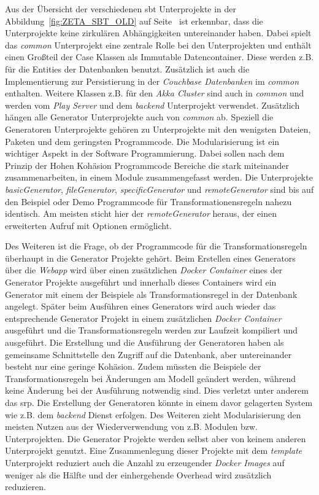 Aus der Übersicht der verschiedenen \ac{sbt} Unterprojekte in der Abbildung~\ref{fig:ZETA_SBT_OLD} auf Seite~\pageref{fig:ZETA_SBT_OLD} ist erkennbar, dass die Unterprojekte keine zirkulären Abhängigkeiten untereinander haben. Dabei spielt das \textit{common} Unterprojekt eine zentrale Rolle bei den Unterprojekten und enthält einen Großteil der Case Klassen als Immutable Datencontainer. Diese werden z.B. für die Entities der Datenbanken benutzt. Zusätzlich ist auch die Implementierung zur Persistierung in der \textit{Couchbase Datenbanken} im \textit{common} enthalten. Weitere Klassen z.B. für den \textit{Akka Cluster} sind auch in \textit{common} und werden vom \textit{Play Server} und dem \textit{backend} Unterprojekt verwendet. Zusätzlich hängen alle Generator Unterprojekte auch von \textit{common} ab. Speziell die Generatoren Unterprojekte gehören zu Unterprojekte mit den wenigsten Dateien, Paketen und dem geringsten Programmcode. Die Modularisierung ist ein wichtiger Aspekt in der Software Programmierung. Dabei sollen nach dem Prinzip der Hohen Kohäsion Programmcode Bereiche die stark miteinander zusammenarbeiten, in einem Module zusammengefasst werden. Die Unterprojekte \textit{basicGenerator}, \textit{fileGenerator}, \textit{specificGenerator} und \textit{remoteGenerator} sind bis auf den Beispiel oder Demo Programmcode für Transformationensregeln nahezu identisch. Am meisten sticht hier der \textit{remoteGenerator} heraus, der einen erweiterten Aufruf mit Optionen ermöglicht. 

Des Weiteren ist die Frage, ob der Programmcode für die Transformationsregeln überhaupt in die Generator Projekte gehört. Beim Erstellen eines Generators über die \textit{Webapp} wird über einen zusätzlichen \textit{Docker Container} eines der Generator Projekte ausgeführt und innerhalb dieses Containers wird ein Generator mit einem der Beispiele als Transformationsregel in der Datenbank angelegt. Später beim Ausführen eines Generators wird auch wieder das entsprechende Generator Projekt in einem zusätzlichen \textit{Docker Container} ausgeführt und die Transformationsregeln werden zur Laufzeit kompiliert und ausgeführt. Die Erstellung und die Ausführung der Generatoren haben als gemeinsame Schnittstelle den Zugriff auf die Datenbank, aber untereinander besteht nur eine geringe Kohäsion. Zudem müssten die Beispiele der Transformationsregeln bei Änderungen am Modell geändert werden, während keine Änderung bei der Ausführung notwendig sind. Dies verletzt unter anderem das \ac{srp}. Die Erstellung der Generatoren könnte in einem davor gelagerten System wie z.B. dem \textit{backend} Dienst erfolgen. Des Weiteren zieht Modularisierung den meisten Nutzen aus der Wiederverwendung von z.B. Modulen bzw. Unterprojekten. Die Generator Projekte werden selbst aber von keinem anderen Unterprojekt genutzt. Eine Zusammenlegung dieser Projekte mit dem \textit{template} Unterprojekt reduziert auch die Anzahl zu erzeugender \textit{Docker Images} auf weniger als die Hälfte und der einhergehende Overhead wird zusätzlich reduzieren.


